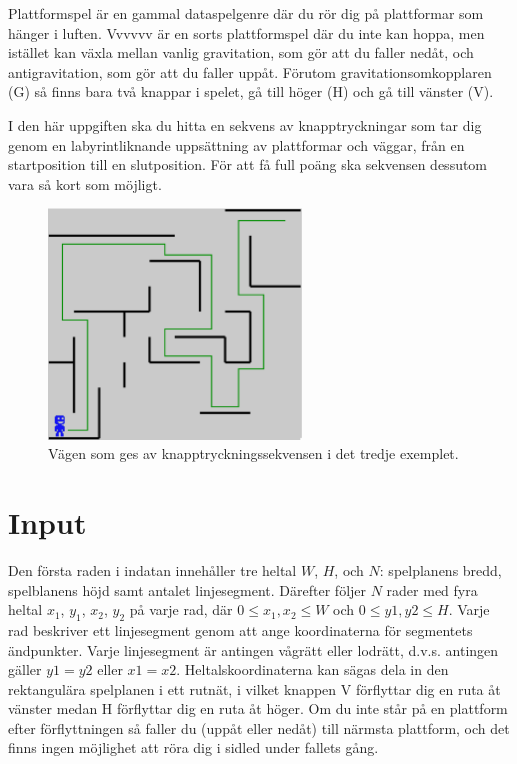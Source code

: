 
Plattformspel är en gammal dataspelgenre där du rör dig på plattformar som hänger i luften. Vvvvvv är en sorts plattformspel där du inte kan hoppa, men istället kan växla mellan vanlig gravitation, som gör att du faller nedåt, och antigravitation, som gör att du faller uppåt. Förutom gravitationsomkopplaren (G) så finns bara två knappar i spelet, gå till höger (H) och gå till vänster (V).

I den här uppgiften ska du hitta en sekvens av knapptryckningar som tar dig genom en labyrintliknande uppsättning av plattformar och väggar, från en startposition till en slutposition. För att få full poäng ska sekvensen dessutom vara så kort som möjligt.

\begin{figure}[ht!]
\centering
\includegraphics[width=0.6\textwidth]{spelplan.pdf}
\caption{Vägen som ges av knapptryckningssekvensen i det tredje exemplet.}
\label{overflow}
\end{figure}


\section*{Input}

Den första raden i indatan innehåller tre heltal $W$, $H$, och $N$: spelplanens bredd, spelblanens höjd samt antalet linjesegment. Därefter följer $N$ rader med fyra heltal $x_1$, $y_1$, $x_2$, $y_2$ på varje rad, där $0 \le x_1,x_2 \le W$ och $0 \le y1,y2 \le H$. Varje rad beskriver ett linjesegment genom att ange koordinaterna för segmentets ändpunkter. Varje linjesegment är antingen vågrätt eller lodrätt, d.v.s. antingen gäller $y1=y2$ eller $x1=x2$. Heltalskoordinaterna kan sägas dela in den rektangulära spelplanen i ett rutnät, i vilket knappen V förflyttar dig en ruta åt vänster medan H förflyttar dig en ruta åt höger. Om du inte står på en plattform efter förflyttningen så faller du (uppåt eller nedåt) till närmsta plattform, och det finns ingen möjlighet att röra dig i sidled under fallets gång.

